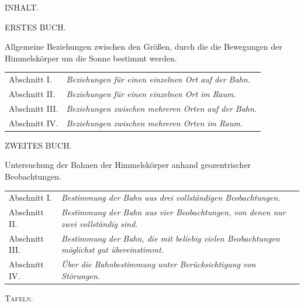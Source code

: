 \clearpage
{}
\begin{center}
{\Large INHALT.}\par\bigskip
{\large ERSTES BUCH.}\par\medskip
Allgemeine Beziehungen zwischen den Größen, durch die die Bewegungen der Himmelskörper um die Sonne bestimmt werden.
\end{center}
\noindent\begin{tabular}{@{}p{.18\linewidth}p{.78\linewidth}@{}}
Abschnitt I. & \emph{Beziehungen für einen einzelnen Ort auf der Bahn.}\\[.4em]
Abschnitt II. & \emph{Beziehungen für einen einzelnen Ort im Raum.}\\[.4em]
Abschnitt III. & \emph{Beziehungen zwischen mehreren Orten auf der Bahn.}\\[.4em]
Abschnitt IV. & \emph{Beziehungen zwischen mehreren Orten im Raum.}
\end{tabular}
\begin{center}\bigskip
{\large ZWEITES BUCH.}\par\medskip
Untersuchung der Bahnen der Himmelskörper anhand geozentrischer Beobachtungen.
\end{center}
\noindent\begin{tabular}{@{}p{.18\linewidth}p{.78\linewidth}@{}}
Abschnitt I. & \emph{Bestimmung der Bahn aus drei vollständigen Beobachtungen.}\\[.4em]
Abschnitt II. & \emph{Bestimmung der Bahn aus vier Beobachtungen, von denen nur zwei vollständig sind.}\\[.4em]
Abschnitt III. & \emph{Bestimmung der Bahn, die mit beliebig vielen Beobachtungen möglichst gut übereinstimmt.}\\[.4em]
Abschnitt IV. & \emph{Über die Bahnbestimmung unter Berücksichtigung von Störungen.}
\end{tabular}
\par\bigskip\noindent\textsc{Tafeln.}
